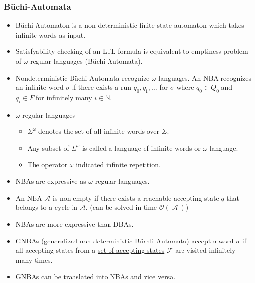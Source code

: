 \documentclass[a4paper,12pt]{article}
\begin{document}
\subsubsection{B\"uchi-Automata}
\begin{itemize}
	\item B\"uchi-Automaton is a non-deterministic finite state-automaton which takes infinite words as input.
	\item Satisfyability checking of an LTL formula is equivalent to emptiness problem of $\omega$-regular languages (B\"uchi-Automata).
	\item Nondeterministic B\"uchi-Automata recognize $\omega$-languages. An NBA recognizes an infinite word $\sigma$ if there exists a run $q_0,q_1,\dots$ for $\sigma$ where $q_0\in Q_0$ and $q_i \in F$ for infinitely many $i \in \mathds{N}$.
	\item $\omega$-regular languages
	\begin{itemize}
		\item $\Sigma^\omega$ denotes the set of all infinite words over $\Sigma$.
		\item Any subset of $\Sigma^\omega$ is called a language of infinite words or $\omega$-language.
		\item The operator $\omega$ indicated infinite repetition.
	\end{itemize}
	\item NBAs are expressive as $\omega$-regular languages.
	\item An NBA $\mathcal{A}$ is non-empty if there exists a reachable accepting state $q$ that belongs to a cycle in $\mathcal{A}$. (can be solved in time $\mathcal{O}(|\mathcal{A}|)$)
	\item NBAs are more expressive than DBAs.
	\item GNBAs (generalized non-deterministic B\"uchli-Automata) accept a word $\sigma$ if all accepting states from a \ul{set of accepting states} $\mathcal{F}$ are visited infinitely many times.
	\item GNBAs can be translated into NBAs and vice versa.
\end{itemize}
\end{document}
